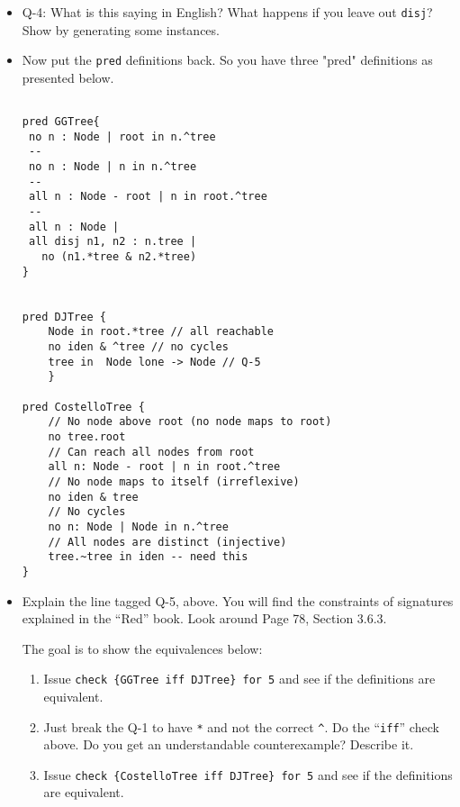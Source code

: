 \documentclass[11pt]{article}
\begin{document}
\begin{enumerate}
\begin{itemize}
\item[] Q-4: What is this saying in English?
What happens if you leave out \verb|disj|?
Show by generating some instances.

\item Now put the {\tt pred} definitions back. So you have three "pred" definitions as presented below.

\begin{scriptsize}
\begin{verbatim}

pred GGTree{
 no n : Node | root in n.^tree
 --
 no n : Node | n in n.^tree
 --
 all n : Node - root | n in root.^tree
 -- 
 all n : Node |
 all disj n1, n2 : n.tree |  
   no (n1.*tree & n2.*tree) 
}


pred DJTree {
    Node in root.*tree // all reachable
    no iden & ^tree // no cycles
    tree in  Node lone -> Node // Q-5
    }

pred CostelloTree {
    // No node above root (no node maps to root)
    no tree.root
    // Can reach all nodes from root                
    all n: Node - root | n in root.^tree
    // No node maps to itself (irreflexive) 
    no iden & tree
    // No cycles                    
    no n: Node | Node in n.^tree
    // All nodes are distinct (injective)           
    tree.~tree in iden -- need this
}
\end{verbatim}
\end{scriptsize}

\item[] Explain the line tagged Q-5, above. You will find the constraints of signatures explained
  in the ``Red'' book. Look around Page 78, Section 3.6.3.

The goal is to show the equivalences below:

\begin{enumerate}
\item Issue \verb|check {GGTree iff DJTree} for 5| and see if the definitions are equivalent.

\item Just break the Q-1 to have \verb|*| and not the correct \verb|^|. Do the ``\verb|iff|''  check above.
Do you get an understandable counterexample? Describe it.

\item Issue \verb|check {CostelloTree iff DJTree} for 5| and see if the definitions are equivalent.
\end{enumerate}


\end{itemize}
  

\end{enumerate}
\end{document}
